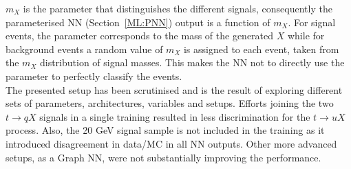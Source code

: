 $m_X$ is the parameter that distinguishes the different signals, consequently the parameterised NN (Section~\ref{ML:PNN}) output is a function of $m_X$. For signal events, the parameter corresponds to the mass of the generated $X$ while for background events a random value of $m_X$ is assigned to each event, taken from the $m_X$ distribution of signal masses. This makes the NN not to directly use the parameter to perfectly classify the events.\\

The presented setup has been scrutinised and is the result of exploring different sets of parameters, architectures, variables and setups. Efforts joining the two $t\to qX$ signals in a single training resulted in less discrimination for the $t\to uX$ process. Also, the 20 GeV signal sample is not included in the training as it introduced disagreement in data/MC in all NN outputs. Other more advanced setups, as a Graph NN, were not substantially improving the performance.\\

